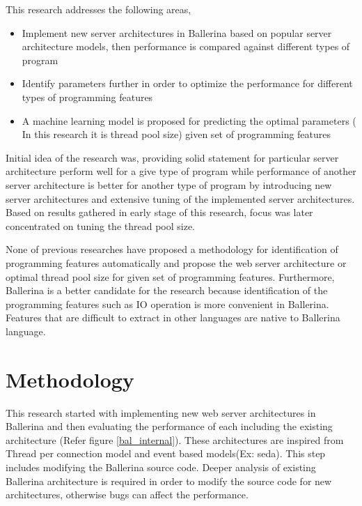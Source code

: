  This research addresses the following areas,
 
 \begin{itemize}
 	\item Implement new server architectures in Ballerina based on popular server architecture models, then performance is compared against different types of program
 	\item Identify parameters further in order to optimize the performance for different types of programming features 
 	\item A machine learning model is proposed for predicting the optimal parameters ( In this research it is thread pool size) given set of programming features
 \end{itemize}
 
 Initial idea of the research was, providing solid statement for particular server architecture perform well for a give type of program while performance of another server architecture is better for another type of program by introducing new server architectures and extensive tuning of the implemented server architectures. Based on results gathered in early stage of this research, focus was later concentrated on tuning the thread pool size.
 
 None of previous researches have proposed a methodology for identification of programming features automatically and propose the web server architecture or optimal thread pool size for given set of programming features. Furthermore, Ballerina is a better candidate for the research because identification of the programming features such as IO operation is more convenient in Ballerina. Features that are difficult to extract in other languages are native to Ballerina language. 
 

\section{Methodology}

	This research started with implementing new web server architectures in Ballerina and then evaluating the performance of each including the existing architecture (Refer figure \ref{bal_internal}). These architectures are inspired from Thread per connection model and event based models(Ex: \acrshort{seda}). This step includes modifying the Ballerina source code. Deeper analysis of existing Ballerina architecture is required in order to modify the source code for new architectures, otherwise bugs can affect the performance. 
	
